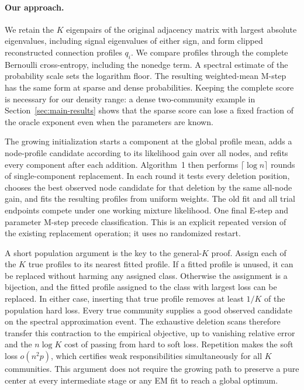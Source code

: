 \paragraph{Our approach.}
We retain the $K$ eigenpairs of the original adjacency matrix with largest absolute eigenvalues, including signal eigenvalues of either sign, and form clipped reconstructed connection profiles $q_i$. We compare profiles through the complete Bernoulli cross-entropy, including the nonedge term. A spectral estimate of the probability scale sets the logarithm floor. The resulting weighted-mean M-step has the same form at sparse and dense probabilities. Keeping the complete score is necessary for our density range: a dense two-community example in Section~\ref{sec:main-results} shows that the sparse score can lose a fixed fraction of the oracle exponent even when the parameters are known.

The growing initialization starts a component at the global profile mean, adds a node-profile candidate according to its likelihood gain over all nodes, and refits every component after each addition. Algorithm~1 then performs $\lceil\log n\rceil$ rounds of single-component replacement. In each round it tests every deletion position, chooses the best observed node candidate for that deletion by the same all-node gain, and fits the resulting profiles from uniform weights. The old fit and all trial endpoints compete under one working mixture likelihood. One final E-step and parameter M-step precede classification. This is an explicit repeated version of the existing replacement operation; it uses no randomized restart.

A short population argument is the key to the general-$K$ proof. Assign each of the $K$ true profiles to its nearest fitted profile. If a fitted profile is unused, it can be replaced without harming any assigned class. Otherwise the assignment is a bijection, and the fitted profile assigned to the class with largest loss can be replaced. In either case, inserting that true profile removes at least $1/K$ of the population hard loss. Every true community supplies a good observed candidate on the spectral approximation event. The exhaustive deletion scans therefore transfer this contraction to the empirical objective, up to vanishing relative error and the $n\log K$ cost of passing from hard to soft loss. Repetition makes the soft loss $o(n^2p)$, which certifies weak responsibilities simultaneously for all $K$ communities. This argument does not require the growing path to preserve a pure center at every intermediate stage or any EM fit to reach a global optimum.

